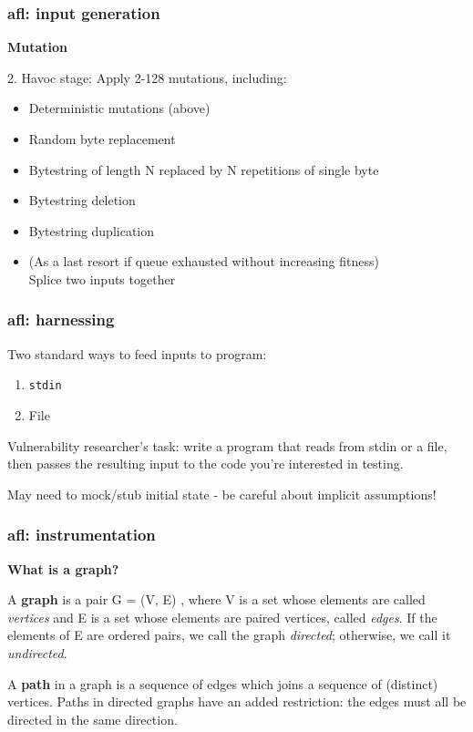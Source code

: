 \documentclass{beamer}
\begin{document}
\begin{frame}
	\frametitle{afl: input generation}
	\textbf{Mutation}

	\vspace{\baselineskip}
	
	2. Havoc stage: Apply 2-128 mutations, including: \begin{itemize}
		\item{Deterministic mutations (above)}
		\item{Random byte replacement}
		\item{Bytestring of length N replaced by N repetitions of single byte}
		\item{Bytestring deletion}
		\item{Bytestring duplication}
		\item{(As a last resort if queue exhausted without increasing fitness) \\Splice two inputs together} %
	\end{itemize}


\end{frame}

\begin{frame}
	\frametitle{afl: harnessing}

	Two standard ways to feed inputs to program: \begin{enumerate}
		\item{\texttt{stdin}}
		\item{File}
	\end{enumerate}

	\vspace{\baselineskip}
	Vulnerability researcher's task: write a program that reads from stdin or a file, then passes the resulting input to the code you're interested in testing. 

	\vspace{\baselineskip}
	May need to mock/stub initial state - be careful about implicit assumptions!
\end{frame}

\begin{frame}
	\frametitle{afl: instrumentation}

\textbf{What is a graph?}
\begin{definition} A \textbf{graph} is a pair  G = (V, E) ,
  where V is a set whose elements are called \textit{vertices} and
  E is a set whose elements are paired vertices, called \textit{edges}.
  If the elements of E are ordered pairs, we call the graph \textit{directed}; otherwise, we call it \textit{undirected}.
\end{definition}
\bigskip
\begin{definition}
  A \textbf{path} in a graph is a sequence of edges which joins a sequence of (distinct) vertices. Paths in directed graphs have an added restriction: the edges must all be directed in the same direction.
\end{definition}
  \end{frame}
\end{document}
